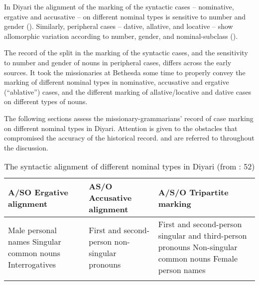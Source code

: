 In Diyari the alignment of the marking of the syntactic cases – nominative, ergative and accusative – on different nominal types is sensitive to number and gender (). Similarly, peripheral cases -- dative, allative, and locative -- show allomorphic variation according to number, gender, and nominal-subclass ().

The record of the split in the marking of the syntactic cases, and the sensitivity to number and gender of nouns in peripheral cases, differs across the early sources. It took the missionaries at Bethesda some time to properly convey the marking of different nominal types in nominative, accusative and ergative (``ablative'') cases, and the different marking of allative/locative and dative cases on different types of nouns.

The following sections assess the missionary-grammarians' record of case marking on different nominal types in Diyari. Attention is given to the obstacles that compromised the accuracy of the historical record.  and  are referred to throughout the discussion.


\begin{table}
\small
\begin{tabularx}{\textwidth}{QQQ}
\lsptoprule
{ {A/{SO}}}   {Ergative alignment} & {  {AS/O}}  {Accusative alignment} & {  {A/S/O}}  {Tripartite marking}\\
\midrule
Male personal names\newline
 Singular common nouns\newline
 Interrogatives & First and second-person non-singular pronouns & First and second-person singular\newline
 and third-person pronouns\newline
 Non-singular common nouns\newline
 Female person names\\
\lspbottomrule
\end{tabularx}
\caption{The syntactic alignment of different nominal types in Diyari (from \citealt{austin_grammar_2013}: 52)}
\label{bkm:Ref466955740}\label{fig:key:8-174}
\end{table}

